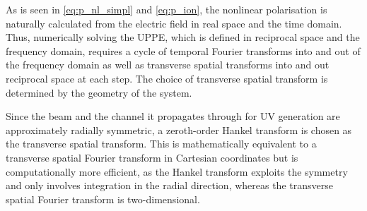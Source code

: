 \documentclass[a4paper]{jpconf}
\begin{document}
As is seen in \eqref{eq:p_nl_simpl} and \eqref{eq:p_ion}, the nonlinear polarisation is naturally calculated from the electric field in real space and the time domain. Thus, numerically solving the UPPE, which is defined in reciprocal space and the frequency domain, requires a cycle of temporal Fourier transforms into and out of the frequency domain as well as transverse spatial transforms into and out reciprocal space at each step. The choice of transverse spatial transform is determined by the geometry of the system. \par 
Since the beam and the channel it propagates through for UV generation are approximately radially symmetric, a zeroth-order Hankel transform is chosen as the transverse spatial transform. This is mathematically equivalent to a  transverse spatial Fourier transform in Cartesian coordinates but is computationally more efficient, as the Hankel transform exploits the symmetry and only involves integration in the radial direction, whereas the transverse spatial Fourier transform is two-dimensional. 
 
\end{document}
